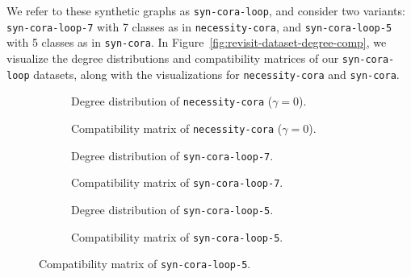 We refer to these synthetic graphs as \texttt{syn-cora-loop}, and consider two variants: \texttt{syn-cora-loop-7} with 7 classes as in \texttt{necessity-cora}, and \texttt{syn-cora-loop-5} with 5 classes as in \texttt{syn-cora}.
In Figure~\ref{fig:revisit-dataset-degree-comp}, we visualize the degree distributions and compatibility matrices of our \texttt{syn-cora-loop} datasets, along with the visualizations for \texttt{necessity-cora} and \texttt{syn-cora}.

\begin{figure}[hbtp]
    \centering
    \begin{subfigure}[b]{0.47\textwidth}
        \caption{Degree distribution of \texttt{necessity-cora} ($\gamma=0$).}
        \label{fig:revisit-dataset-degree-comp-necessity-cora-degree}
    \end{subfigure}
    \hspace{0.04\textwidth}
    \begin{subfigure}[b]{0.47\textwidth}
        \caption{Compatibility matrix of \texttt{necessity-cora} ($\gamma=0$).}
        \label{fig:revisit-dataset-degree-comp-necessity-cora-comp}
    \end{subfigure}
    
    \begin{subfigure}[b]{0.47\textwidth}
        \caption{Degree distribution of \texttt{syn-cora-loop-7}.}
    \end{subfigure}
    \hspace{0.04\textwidth}
    \begin{subfigure}[b]{0.47\textwidth}
        \caption{Compatibility matrix of \texttt{syn-cora-loop-7}.}
    \end{subfigure}

    \begin{subfigure}[b]{0.47\textwidth}
        \caption{Degree distribution of \texttt{syn-cora-loop-5}.}
    \end{subfigure}
    \hspace{0.04\textwidth}
    \begin{subfigure}[b]{0.47\textwidth}
        \caption{Compatibility matrix of \texttt{syn-cora-loop-5}.}
    \end{subfigure}


\end{figure}
